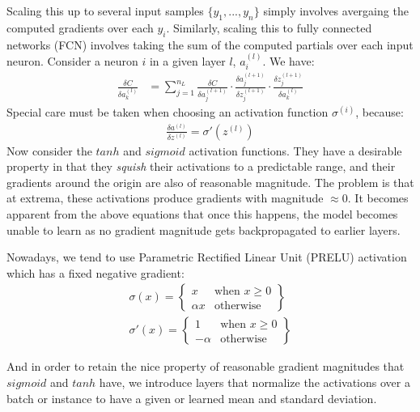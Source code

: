 \documentclass[paper=a4, fontsize=12pt]{scrartcl} %
\numberwithin{equation}{section} %
\numberwithin{figure}{section} %
\numberwithin{table}{section} %
\begin{document}
Scaling this up to several input samples $\{y_1, ..., y_n\}$ simply involves avergaing the computed gradients over each $y_i$. Similarly, scaling this 
to fully connected networks (FCN) involves taking the sum of the computed partials over each input neuron. Consider a neuron $i$ in a given layer $l$, $a^{(l)}_i$. We have:
\begin{align*}
    \frac{\delta C}{\delta a^{(l)}_k} &= \sum_{j = 1}^{n_L} \frac{\delta C}{\delta a^{(l+1)}_j} \cdot \frac{\delta a^{(l+1)}_j}{\delta z^{(l+1)}_j} \cdot \frac{\delta z^{(l+1)}_j}{\delta a^{(l)}_k} 
\end{align*}
Special care must be taken when choosing an activation function $\sigma^{(i)}$, because:
\begin{align*}
    \frac{\delta a^{(l)}}{\delta z^{(l)}} = \sigma'(z^{(l)})
\end{align*}
Now consider the \href{https://www.desmos.com/calculator/esp2zr8pgp}{$tanh$} and \href{https://www.desmos.com/calculator/kn9tpwdan5}{$sigmoid$} activation functions. They have a desirable property in that they 
\textit{squish} their activations to a predictable range, and their gradients around the origin are also of reasonable magnitude. The problem is that at extrema, these 
activations produce gradients with magnitude $\approx 0$. It becomes apparent from the above equations that once this happens, the model becomes unable to learn as no gradient magnitude gets 
backpropagated to earlier layers.

Nowadays, we tend to use Parametric Rectified Linear Unit (PRELU) activation which has a fixed negative gradient:
\begin{align*}
    \sigma(x) = \left.
        \begin{cases}
            x & \text{when } x \geq 0 \\
            \alpha x & \text{otherwise}
        \end{cases}
    \right\} \\
    \sigma'(x) = \left.
        \begin{cases}
            1 & \text{when } x \geq 0 \\
            -\alpha & \text{otherwise}
        \end{cases}
    \right\}
\end{align*}

And in order to retain the nice property of reasonable gradient magnitudes that $sigmoid$ and $tanh$ have, we 
introduce layers that normalize the activations over a batch \cite{batchnorm} or instance \cite{instancenorm} to have a given or learned mean and standard deviation.
\end{document}
